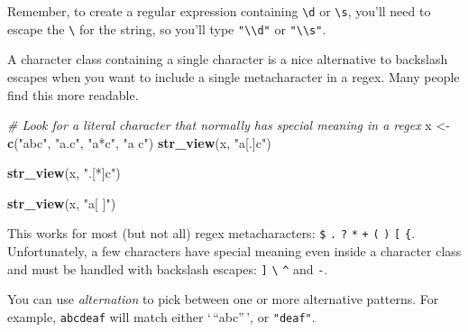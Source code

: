 \documentclass[]{book}
\newenvironment{Shaded}{\begin{snugshade}}{\end{snugshade}}
\newcommand{\CommentTok}[1]{\textcolor[rgb]{0.56,0.35,0.01}{\textit{#1}}}
\newcommand{\KeywordTok}[1]{\textcolor[rgb]{0.13,0.29,0.53}{\textbf{#1}}}
\newcommand{\NormalTok}[1]{#1}
\newcommand{\StringTok}[1]{\textcolor[rgb]{0.31,0.60,0.02}{#1}}
\begin{document}
Remember, to create a regular expression containing \texttt{\textbackslash{}d} or \texttt{\textbackslash{}s}, you'll need to escape the \texttt{\textbackslash{}} for the string, so you'll type \texttt{"\textbackslash{}\textbackslash{}d"} or \texttt{"\textbackslash{}\textbackslash{}s"}.

A character class containing a single character is a nice alternative to backslash escapes when you want to include a single metacharacter in a regex. Many people find this more readable.

\begin{Shaded}
\begin{Highlighting}[]
\CommentTok{# Look for a literal character that normally has special meaning in a regex}
\NormalTok{x <-}\StringTok{ }\KeywordTok{c}\NormalTok{(}\StringTok{"abc"}\NormalTok{, }\StringTok{"a.c"}\NormalTok{, }\StringTok{"a*c"}\NormalTok{, }\StringTok{"a c"}\NormalTok{)}
\KeywordTok{str_view}\NormalTok{(x, }\StringTok{"a[.]c"}\NormalTok{)}
\end{Highlighting}
\end{Shaded}

\hypertarget{htmlwidget-3f27c09be0c60bb52829}{}

\begin{Shaded}
\begin{Highlighting}[]
\KeywordTok{str_view}\NormalTok{(x, }\StringTok{".[*]c"}\NormalTok{)}
\end{Highlighting}
\end{Shaded}

\hypertarget{htmlwidget-416566eb193bf50d04e6}{}

\begin{Shaded}
\begin{Highlighting}[]
\KeywordTok{str_view}\NormalTok{(x, }\StringTok{"a[ ]"}\NormalTok{)}
\end{Highlighting}
\end{Shaded}

\hypertarget{htmlwidget-72cbf064100ce560a04c}{}

This works for most (but not all) regex metacharacters: \texttt{\$} \texttt{.} \texttt{\textbar{}} \texttt{?} \texttt{*} \texttt{+} \texttt{(} \texttt{)} \texttt{{[}} \texttt{\{}. Unfortunately, a few characters have special meaning even inside a character class and must be handled with backslash escapes: \texttt{{]}} \texttt{\textbackslash{}} \texttt{\^{}} and \texttt{-}.

You can use \emph{alternation} to pick between one or more alternative patterns. For example, \texttt{abc\textbar{}deaf} will match either `\,``abc''\,', or \texttt{"deaf"}.
\end{document}

